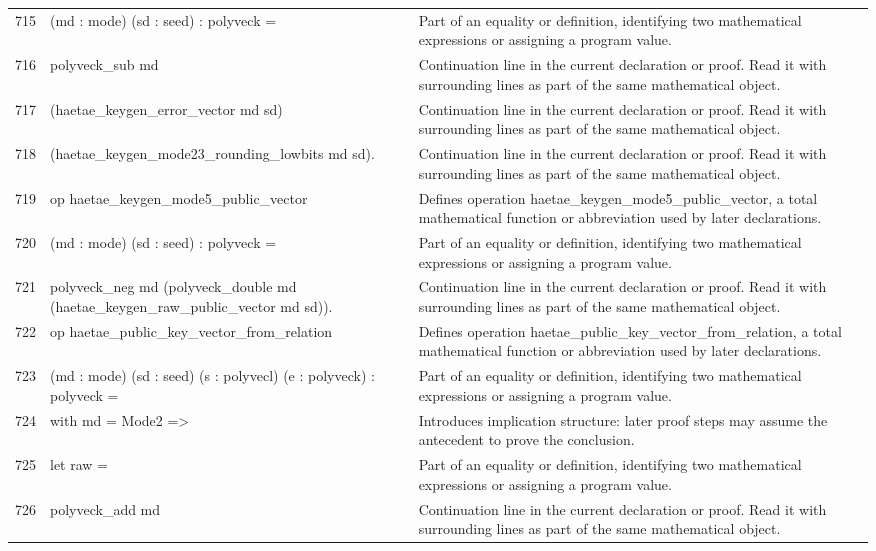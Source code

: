 \documentclass[10pt]{article}
\begin{document}
\begin{longtable}{r L{0.53\textwidth} L{0.37\textwidth}}
715 & {\ttfamily\scriptsize    (md : mode) (sd : seed) : polyveck =} & Part of an equality or definition, identifying two mathematical expressions or assigning a program value. \\
716 & {\ttfamily\scriptsize   polyveck\_sub md} & Continuation line in the current declaration or proof.  Read it with surrounding lines as part of the same mathematical object. \\
717 & {\ttfamily\scriptsize     (haetae\_keygen\_error\_vector md sd)} & Continuation line in the current declaration or proof.  Read it with surrounding lines as part of the same mathematical object. \\
718 & {\ttfamily\scriptsize     (haetae\_keygen\_mode23\_rounding\_lowbits md sd).} & Continuation line in the current declaration or proof.  Read it with surrounding lines as part of the same mathematical object. \\
719 & {\ttfamily\scriptsize op haetae\_keygen\_mode5\_public\_vector} & Defines operation haetae\_keygen\_mode5\_public\_vector, a total mathematical function or abbreviation used by later declarations. \\
720 & {\ttfamily\scriptsize    (md : mode) (sd : seed) : polyveck =} & Part of an equality or definition, identifying two mathematical expressions or assigning a program value. \\
721 & {\ttfamily\scriptsize   polyveck\_neg md (polyveck\_double md (haetae\_keygen\_raw\_public\_vector md sd)).} & Continuation line in the current declaration or proof.  Read it with surrounding lines as part of the same mathematical object. \\
722 & {\ttfamily\scriptsize op haetae\_public\_key\_vector\_from\_relation} & Defines operation haetae\_public\_key\_vector\_from\_relation, a total mathematical function or abbreviation used by later declarations. \\
723 & {\ttfamily\scriptsize    (md : mode) (sd : seed) (s : polyvecl) (e : polyveck) : polyveck =} & Part of an equality or definition, identifying two mathematical expressions or assigning a program value. \\
724 & {\ttfamily\scriptsize   with md = Mode2 =>} & Introduces implication structure: later proof steps may assume the antecedent to prove the conclusion. \\
725 & {\ttfamily\scriptsize     let raw =} & Part of an equality or definition, identifying two mathematical expressions or assigning a program value. \\
726 & {\ttfamily\scriptsize       polyveck\_add md} & Continuation line in the current declaration or proof.  Read it with surrounding lines as part of the same mathematical object. \\

\end{longtable}
\end{document}
